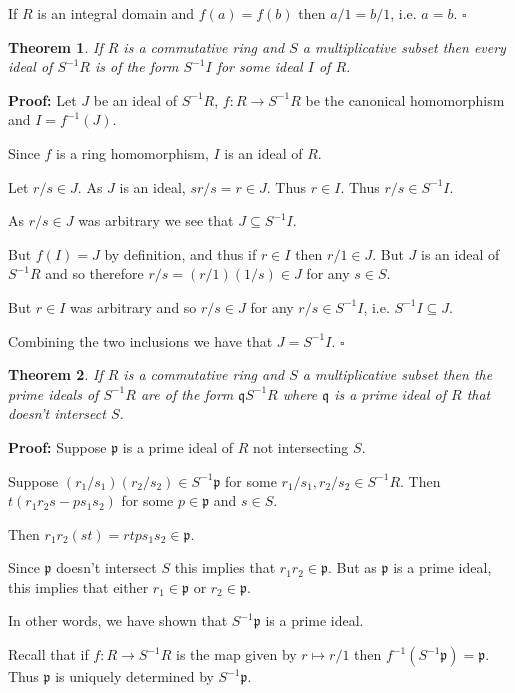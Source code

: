 \documentclass[10pt]{article}
\newcommand{\qed}{\square}
\newtheorem{theorem}{Theorem}[section]
\begin{document}
If $R$ is an integral domain and $f(a) = f(b)$ then $a/1 = b/1$, i.e. $a = b$. $\qed$

\begin{theorem}
If $R$ is a commutative ring and $S$ a multiplicative subset then every ideal of $S^{-1}R$ is of the form $S^{-1}I$ for some ideal $I$ of $R$.
\end{theorem}

\textbf{Proof:}
Let $J$ be an ideal of $S^{-1}R$, $f : R \to S^{-1}R$ be the canonical homomorphism and $I = f^{-1}(J)$.

Since $f$ is a ring homomorphism, $I$ is an ideal of $R$.

Let $r/s \in J$. As $J$ is an ideal, $sr/s = r \in J$. Thus $r \in I$. Thus $r/s \in S^{-1}I$.

As $r/s \in J$ was arbitrary we see that $J \subseteq S^{-1}I$.

But $f(I) = J$ by definition, and thus if $r \in I$ then $r/1 \in J$. But $J$ is an ideal of $S^{-1}R$ and so therefore $r/s = (r/1)(1/s) \in J$ for any $s \in S$.

But $r \in I$ was arbitrary and so $r/s \in J$ for any $r/s \in S^{-1}I$, i.e. $S^{-1}I \subseteq J$.

Combining the two inclusions we have that $J = S^{-1}I$. $\qed$

\begin{theorem}
If $R$ is a commutative ring and $S$ a multiplicative subset then the prime ideals of $S^{-1}R$ are of the form $\mathfrak{q}S^{-1}R$ where $\mathfrak{q}$ is a prime ideal of $R$ that doesn't intersect $S$.
\end{theorem}

\textbf{Proof:}
Suppose $\mathfrak{p}$ is a prime ideal of $R$ not intersecting $S$.

Suppose $(r_1/s_1)(r_2/s_2) \in S^{-1}\mathfrak{p}$ for some $r_1/s_1, r_2/s_2 \in S^{-1}R$. Then $t(r_1r_2s - ps_1s_2)$ for some $p \in \mathfrak{p}$ and $s \in S$.

Then $r_1r_2(st) = rtps_1s_2 \in \mathfrak{p}$.

Since $\mathfrak{p}$ doesn't intersect $S$ this implies that $r_1r_2 \in \mathfrak{p}$. But as $\mathfrak{p}$ is a prime ideal, this implies that either $r_1 \in \mathfrak{p}$ or $r_2 \in \mathfrak{p}$.

In other words, we have shown that $S^{-1}\mathfrak{p}$ is a prime ideal.

Recall that if $f : R \to S^{-1}R$ is the map given by $r \mapsto r/1$ then $f^{-1}(S^{-1}\mathfrak{p}) = \mathfrak{p}$. Thus $\mathfrak{p}$ is uniquely determined by $S^{-1}\mathfrak{p}$.
\end{document}
